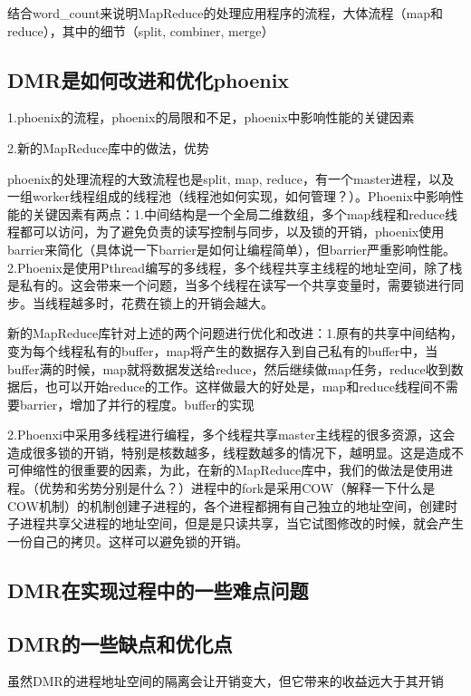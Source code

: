 {\color{red}结合word\_count来说明MapReduce的处理应用程序的流程，大体流程（map和reduce），其中的细节（split, combiner, merge）}


\subsection{DMR是如何改进和优化phoenix}
1.phoenix的流程，phoenix的局限和不足，phoenix中影响性能的关键因素

2.新的MapReduce库中的做法，优势


phoenix的处理流程的大致流程也是split, map, reduce，有一个master进程，以及一组worker线程组成的线程池（线程池如何实现，如何管理？）。Phoenix中影响性能的关键因素有两点：1.中间结构是一个全局二维数组，多个map线程和reduce线程都可以访问，为了避免负责的读写控制与同步，以及锁的开销，phoenix使用barrier来简化（具体说一下barrier是如何让编程简单），但barrier严重影响性能。2.Phoenix是使用Pthread编写的多线程，多个线程共享主线程的地址空间，除了栈是私有的。这会带来一个问题，当多个线程在读写一个共享变量时，需要锁进行同步。当线程越多时，花费在锁上的开销会越大。

新的MapReduce库针对上述的两个问题进行优化和改进：1.原有的共享中间结构，变为每个线程私有的buffer，map将产生的数据存入到自己私有的buffer中，当buffer满的时候，map就将数据发送给reduce，然后继续做map任务，reduce收到数据后，也可以开始reduce的工作。这样做最大的好处是，map和reduce线程间不需要barrier，增加了并行的程度。buffer的实现

2.Phoenxi中采用多线程进行编程，多个线程共享master主线程的很多资源，这会造成很多锁的开销，特别是核数越多，线程数越多的情况下，越明显。这是造成不可伸缩性的很重要的因素，为此，在新的MapReduce库中，我们的做法是使用进程。（优势和劣势分别是什么？）进程中的fork是采用COW（解释一下什么是COW机制）的机制创建子进程的，各个进程都拥有自己独立的地址空间，创建时子进程共享父进程的地址空间，但是是只读共享，当它试图修改的时候，就会产生一份自己的拷贝。这样可以避免锁的开销。



\subsection{DMR在实现过程中的一些难点问题}



\subsection{DMR的一些缺点和优化点}
虽然DMR的进程地址空间的隔离会让开销变大，但它带来的收益远大于其开销

